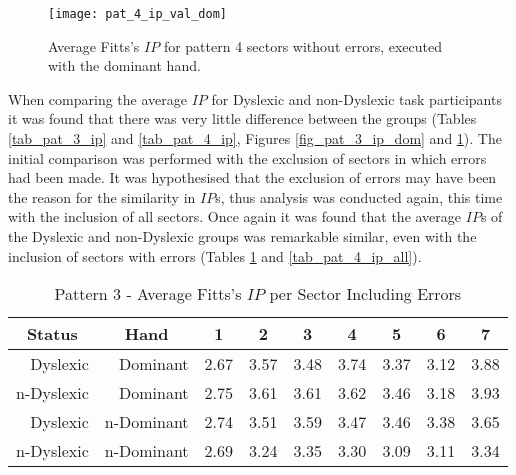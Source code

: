 	\begin{figure}[h]
		\centering
		\texttt{[image: pat\_4\_ip\_val\_dom]}
		\caption{Average Fitts's \(IP\) for pattern 4 sectors without errors, executed with the dominant hand.}
		\label{fig_pat_4_ip_dom}
	\end{figure}

	When comparing the average \(IP\) for Dyslexic and non-Dyslexic task participants it was found that there was very little difference between the groups (Tables \ref{tab_pat_3_ip} and \ref{tab_pat_4_ip}, Figures \ref{fig_pat_3_ip_dom} and \ref{fig_pat_4_ip_dom}). The initial comparison was performed with the exclusion of sectors in which errors had been made. It was hypothesised that the exclusion of errors may have been the reason for the similarity in \(IP\)s, thus analysis was conducted again, this time with the inclusion of all sectors. Once again it was found that the average \(IP\)s of the Dyslexic and non-Dyslexic groups was remarkable similar, even with the inclusion of sectors with errors (Tables \ref{tab_pat_3_ip_all} and \ref{tab_pat_4_ip_all}).
	
	\begin{table}[h]
		\centering
		\caption{Pattern 3 - Average Fitts's \(IP\) per Sector Including Errors}
		\label{tab_pat_3_ip_all}
		\begin{tabularx}{\textwidth}{|r|r|X|X|X|X|X|X|X|}
			\hline
			\multicolumn{1}{|c|}{\textbf{Status}} & \multicolumn{1}{c|}{\textbf{Hand}} & \multicolumn{1}{c|}{\textbf{1}} & \multicolumn{1}{c|}{\textbf{2}} & \multicolumn{1}{c|}{\textbf{3}} & \multicolumn{1}{c|}{\textbf{4}} & \multicolumn{1}{c|}{\textbf{5}} & \multicolumn{1}{c|}{\textbf{6}} & \multicolumn{1}{c|}{\textbf{7}} \\ \hline
			Dyslexic                              & Dominant                           & 2.67       & 3.57       & 3.48       & 3.74       & 3.37       & 3.12       & 3.88       \\ \hline
			n-Dyslexic                          & Dominant                           & 2.75       & 3.61       & 3.61       & 3.62       & 3.46       & 3.18       & 3.93       \\ \hline
			Dyslexic                              & n-Dominant                       & 2.74       & 3.51       & 3.59       & 3.47       & 3.46       & 3.38       & 3.65       \\ \hline
			n-Dyslexic                          & n-Dominant                       & 2.69       & 3.24       & 3.35       & 3.30       & 3.09       & 3.11       & 3.34       \\ \hline
		\end{tabularx}
	\end{table}


